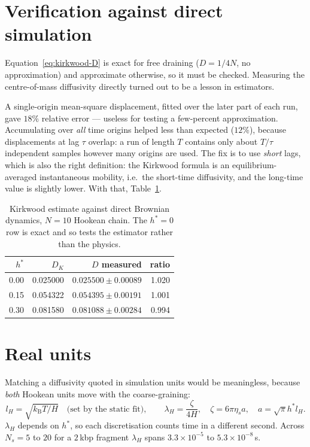 \documentclass[11pt,a4paper]{report}
\newcommand{\kB}{k_\mathrm{B}}
\begin{document}
\section{Verification against direct simulation}

Equation~\eqref{eq:kirkwood-D} is exact for free draining ($D = 1/4N$, no
approximation) and approximate otherwise, so it must be checked. Measuring the
centre-of-mass diffusivity directly turned out to be a lesson in estimators.

A single-origin mean-square displacement, fitted over the later part of each run,
gave $18\%$ relative error --- useless for testing a few-percent approximation.
Accumulating over \emph{all} time origins helped less than expected ($12\%$),
because displacements at lag $\tau$ overlap: a run of length $T$ contains only
about $T/\tau$ independent samples however many origins are used. The fix is to
use \emph{short} lags, which is also the right definition: the Kirkwood formula is
an equilibrium-averaged instantaneous mobility, i.e.\ the short-time diffusivity,
and the long-time value is slightly lower. With that, Table~\ref{tab:kirkwood-bd}.

\begin{table}[ht]
\centering
\caption{Kirkwood estimate against direct Brownian dynamics, $N = 10$ Hookean
chain. The $h^{*} = 0$ row is exact and so tests the estimator rather than the
physics.}
\label{tab:kirkwood-bd}
\begin{tabular}{@{}rrrr@{}}
\toprule
$h^{*}$ & $D_K$ & $D$ measured & ratio \\
\midrule
0.00 & 0.025000 & $0.025500 \pm 0.00089$ & 1.020 \\
0.15 & 0.054322 & $0.054395 \pm 0.00191$ & 1.001 \\
0.30 & 0.081580 & $0.081088 \pm 0.00284$ & 0.994 \\
\bottomrule
\end{tabular}
\end{table}

\section{Real units}
\label{sec:real-units}

Matching a diffusivity quoted in simulation units would be meaningless, because
\emph{both} Hookean units move with the coarse-graining:
\begin{equation}
  l_H = \sqrt{\kB T/H}\quad\text{(set by the static fit)},
  \qquad
  \lambda_H = \frac{\zeta}{4H},\quad \zeta = 6\pi\eta_s a,\quad a = \sqrt{\pi}h^{*}l_H .
\end{equation}
$\lambda_H$ depends on $h^{*}$, so each discretisation counts time in a different
second. Across $N_s = 5$ to $20$ for a $2$\,kbp fragment $\lambda_H$ spans
$3.3\times10^{-5}$ to $5.3\times10^{-8}$\,s.
\end{document}
